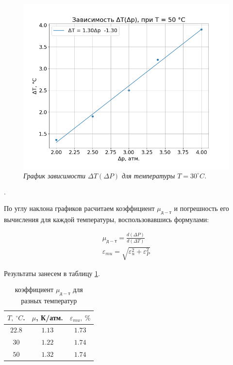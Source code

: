 \documentclass[a4paper, 12pt]{article}
\newcounter{Points}
\newcommand{\point}{\arabic{Points}. \addtocounter{Points}{1}}
\begin{document}
\begin{figure}[h]
    \centering
    \includegraphics[width=\linewidth]{plot_dt_from_dp_T_50.png}
    \caption{\textit{График зависимости $\Delta T \left(\Delta P\right)$ для температуры $T = 30 ^\circ C$.}}
    \label{fig:plot_dt_from_dp_T_50}
\end{figure}

\point По углу наклона графиков расчитаем коэффициент  $\mu_{д-т}$ и погрешность его вычисления для каждой температуры, воспользовавшись формулами:

\begin{gather*}
    \mu_{д-т} = \frac{d\left(\Delta P\right)}{d\left(\Delta T\right)} \\
    \varepsilon_{mu} = \sqrt{\varepsilon_u^2 + \varepsilon_{P}^2}
\end{gather*}

Результаты занесем в таблицу \ref{tabl:mus}.

\begin{table}[h]
    \centering
    \begin{tabular}{|c|c|c|}\hline
    $T,~^\circ C$.	& $\mu$, К/атм.	& $\varepsilon_{mu},~\%$	\\ \hline
    $22.8$	& $1.13$	& $1.73$\\ \hline
    $30$	& $1.22$	& $1.74$\\ \hline
    $50$	& $1.32$	& $1.74$\\ \hline
    \end{tabular}
    \caption{коэффициент $\mu_{д-т}$ для разных температур}
    \label{tabl:mus}
\end{table}
\end{document}
